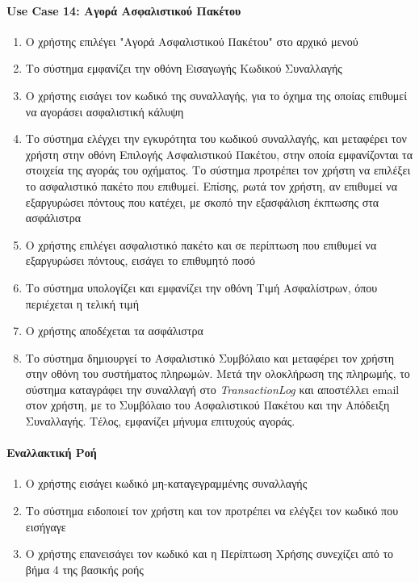 \documentclass{../ol-softwaremanual}
\begin{document}
	\paragraph{\en Use Case 14: \gr Αγορά Ασφαλιστικού Πακέτου}
	\begin{enumerate}
		\item Ο χρήστης επιλέγει \en"\gr Αγορά Ασφαλιστικού Πακέτου\en" \gr στο αρχικό μενού
		\item Το σύστημα εμφανίζει την οθόνη Εισαγωγής Κωδικού Συναλλαγής
		\item Ο χρήστης εισάγει τον κωδικό της συναλλαγής, για το όχημα της οποίας επιθυμεί να αγοράσει ασφαλιστική κάλυψη
		\item Το σύστημα ελέγχει την εγκυρότητα του κωδικού συναλλαγής, και μεταφέρει τον χρήστη στην οθόνη Επιλογής Ασφαλιστικού Πακέτου, στην οποία εμφανίζονται τα στοιχεία της αγοράς του οχήματος. Το σύστημα προτρέπει τον χρήστη να επιλέξει το ασφαλιστικό πακέτο που επιθυμεί. Επίσης, ρωτά τον χρήστη, αν επιθυμεί να εξαργυρώσει πόντους που κατέχει, με σκοπό την εξασφάλιση έκπτωσης στα ασφάλιστρα
		\item Ο χρήστης επιλέγει ασφαλιστικό πακέτο και σε περίπτωση που επιθυμεί να εξαργυρώσει πόντους, εισάγει το επιθυμητό ποσό
		\item Το σύστημα υπολογίζει και εμφανίζει την οθόνη Τιμή Ασφαλίστρων, όπου περιέχεται η τελική τιμή 
		\item Ο χρήστης αποδέχεται τα ασφάλιστρα
		\item Το σύστημα δημιουργεί το Ασφαλιστικό Συμβόλαιο και μεταφέρει τον χρήστη στην οθόνη του συστήματος πληρωμών. Μετά την ολοκλήρωση της πληρωμής, το σύστημα καταγράφει την συναλλαγή στο \en \textit{TransactionLog} \gr και αποστέλλει \en email \gr στον χρήστη, με το Συμβόλαιο του Ασφαλιστικού Πακέτου και την Απόδειξη Συναλλαγής. Τέλος, εμφανίζει μήνυμα επιτυχούς αγοράς.		
	\end{enumerate}
	
	\paragraph{Εναλλακτική Ροή }
	
	\begin{enumerate}
			\item Ο χρήστης εισάγει κωδικό μη-καταγεγραμμένης συναλλαγής
			\item Το σύστημα ειδοποιεί τον χρήστη και τον προτρέπει να ελέγξει τον κωδικό που εισήγαγε
			\item Ο χρήστης επανεισάγει τον κωδικό και η Περίπτωση Χρήσης συνεχίζει από το βήμα 4 της βασικής ροής
	\end{enumerate}
	
\end{document}

